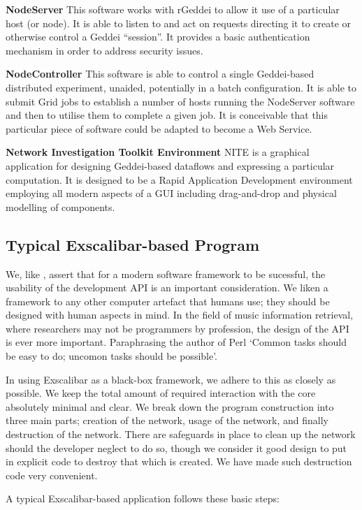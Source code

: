 {\bf NodeServer} This software works with rGeddei to allow it use of a particular host (or node). It is able to listen to and act on requests directing it to create or otherwise control a Geddei ``session''. It provides a basic authentication mechanism in order to address security issues.

{\bf NodeController} This software is able to control a single Geddei-based distributed experiment, unaided, potentially in a batch configuration. It is able to submit Grid jobs to establish a number of hosts running the NodeServer software and then to utilise them to complete a given job. It is conceivable that this particular piece of software could be adapted to become a Web Service.

{\bf Network Investigation Toolkit Environment} NITE is a graphical application for designing Geddei-based dataflows and expressing a particular computation. It is designed to be a Rapid Application Development environment employing all modern aspects of a GUI including drag-and-drop and physical modelling of components.

\subsection{Typical Exscalibar-based Program}

We, like \cite{amatriain04object}, assert that for a modern software framework to be sucessful, the usability of the development API is an important consideration. We liken a framework to any other computer artefact that humans use; they should be designed with human aspects in mind. In the field of music information retrieval, where researchers may not be programmers by profession, the design of the API is ever more important. Paraphrasing the author of Perl `Common tasks should be easy to do; uncomon tasks should be possible'.

In using Exscalibar as a black-box framework, we adhere to this as closely as possible. We keep the total amount of required interaction with the core absolutely minimal and clear. We break down the program construction into three main parts; creation of the network, usage of the network, and finally destruction of the network. There are safeguards in place to clean up the network should the developer neglect to do so, though we consider it good design to put in explicit code to destroy that which is created. We have made such destruction code very convenient.

A typical Exscalibar-based application follows these basic steps:

